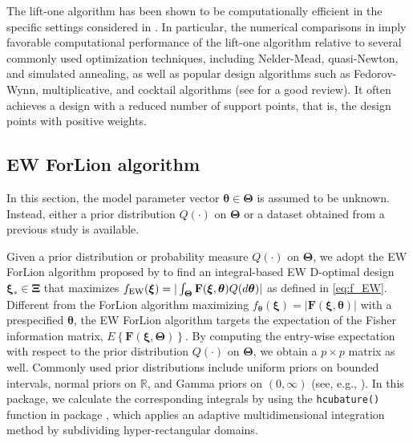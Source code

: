 The lift-one algorithm has been shown to be computationally efficient in the specific settings considered in \cite{ymm2016}. In particular, the numerical comparisons in \cite{ymm2016} imply favorable computational performance of the lift-one algorithm relative to several commonly used optimization techniques, including Nelder-Mead, quasi-Newton, and simulated annealing, as well as popular design algorithms such as Fedorov-Wynn, multiplicative, and cocktail algorithms (see \cite{huang2024forlion} for a good review). It often achieves a design with a reduced number of support points, that is, the design points with positive weights.

\subsection{EW ForLion algorithm} \label{sec:EW_ForLion}

In this section, the model parameter vector $\boldsymbol{\theta} \in \boldsymbol{\Theta}$ is assumed to be unknown. Instead, either a prior distribution $Q(\cdot)$ on $\boldsymbol{\Theta}$ or a dataset obtained from a previous study is available.

Given a prior distribution or probability measure $Q(\cdot)$ on $\boldsymbol{\Theta}$, we adopt the EW ForLion algorithm proposed by \cite{lin2025ew} to find an integral-based EW D-optimal design $\boldsymbol{\xi}_*\in \boldsymbol{\Xi}$ that maximizes $f_{\rm EW}(\boldsymbol{\xi}) = |\int_{\boldsymbol{\Theta}} {\mathbf F}(\boldsymbol{\xi}, \boldsymbol{\theta}) Q(d\boldsymbol{\theta})|$ as defined in \eqref{eq:f_EW}.
Different from the ForLion algorithm maximizing $f_{\boldsymbol{\theta}}(\boldsymbol \xi)=| \mathbf F(\boldsymbol \xi, \boldsymbol \theta)|$ with a prespecified $\boldsymbol{\theta}$, the EW ForLion algorithm 
targets the expectation of the Fisher information matrix, $E\left\{ {\mathbf F}(\boldsymbol{\xi}, \boldsymbol{\Theta})\right\}$.
By computing the entry-wise expectation with respect to the prior distribution $Q(\cdot)$ on $\boldsymbol{\Theta}$, we obtain a $p\times p$ matrix as well. 
Commonly used prior distributions include uniform priors on bounded intervals, normal priors on $\mathbb{R}$, and Gamma priors on $(0, \infty)$ (see, e.g., \cite{huang2025constrained}). In this package, we calculate the corresponding integrals by using the \texttt{hcubature()} function in package  \citep{balasubramanianpackage}, which applies an adaptive multidimensional integration method by subdividing hyper-rectangular domains.


